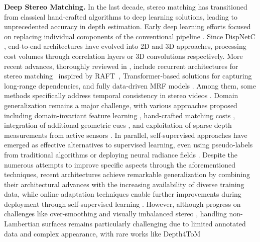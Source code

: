     \textbf{Deep Stereo Matching.} In the last decade, stereo matching has transitioned from classical hand-crafted algorithms \cite{scharstein2002taxonomy} to deep learning solutions, leading to unprecedented accuracy in depth estimation. Early deep learning efforts focused on replacing individual components of the conventional pipeline \cite{zbontar2015computing,vzbontar2016stereo_MC-CNN,seki2017sgm, spyropoulos2014learning, tosi2024neural}. Since DispNetC \cite{mayer2016large}, end-to-end architectures have evolved into 2D \cite{yin2019hierarchical,liang2018learning_iResNet,song2019edgestereo, yin2019hierarchical} and 3D \cite{kendall2017end_GC-NET,yang2019hierarchical,zhang2019ga,bangunharcana2021correlate,Zeng_2023_ICCV,chang2018pyramid,guo2019group,shen2021cfnet,chen2023learning,shen2022pcw} approaches, processing cost volumes through correlation layers or 3D convolutions respectively. More recent advances, thoroughly reviewed in \cite{poggi2021synergies,laga2020survey,tosi2024survey}, include recurrent architectures for stereo matching~\cite{lipson2021raft,wang2024selective, chen2024mocha, zhao2023high, xu2023iterative, li2022practical, Jing_2023_ICCV, gong2024learning} inspired by RAFT~\cite{teed2020raft}, Transformer-based solutions \cite{Li_2021_ICCV_STTR, guo2022context_CEST, xu2023unifying, Su_2022_CVPR_Chitransformer, croco_v2,lou2023elfnet,zhang2024learning} for capturing long-range dependencies, and fully data-driven MRF models \cite{guan2024neural}. Among them, some methods specifically address temporal consistency in stereo videos \cite{Zhang2023TemporalStereo, Karaev_2023_CVPR, jing2024match, zeng2024temporally}. Domain generalization remains a major challenge, with various approaches proposed including domain-invariant feature learning \cite{zhang2019domaininvariant, Liu_2022_CVPR, Rao_2023_CVPR, Chuah_2022_CVPR, Song_2021_CVPR}, hand-crafted matching costs \cite{cai2020matchingspace, cheng2022revisiting}, integration of additional geometric cues \cite{aleotti2021neural, Pilzer_2023_WACV, tosi2024neural}, and exploitation of sparse depth measurements from active sensors \cite{poggi2019guided, bartolomei2023active, li2024stereo}. In parallel, self-supervised approaches \cite{godard2017unsupervised, Liu_2020_CVPR_Flow2Stereo} have emerged as effective alternatives to supervised learning, even using pseudo-labels from traditional algorithms \cite{tonioni2017unsupervised, aleotti2020reversing} or deploying neural radiance fields \cite{Tosi_2023_CVPR}. Despite the numerous attempts to improve specific aspects through the aforementioned techniques, recent architectures achieve remarkable generalization by combining their architectural advances with the increasing availability of diverse training data, while online adaptation techniques enable further improvements during deployment through self-supervised learning \cite{tonioni2019real, kim2022pointfix, poggi2021continual, Poggi_2024_CVPR}. However, although progress on challenges like over-smoothing \cite{Tosi2021CVPR_SMD,Xu_CVPR_2024_ADL} and visually imbalanced stereo \cite{liu2020visually,Chen_2022_CVPR,aleotti2021neural,tosi2024neural}, handling non-Lambertian surfaces remains particularly challenging due to limited annotated data and complex appearance, with rare works like Depth4ToM 